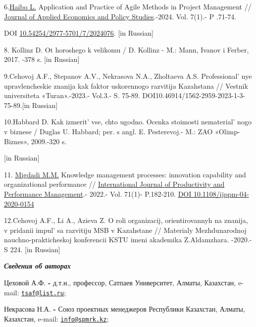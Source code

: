 6.\href{https://www.researchgate.net/scientific-contributions/Haibo-Li-2290691805?_tp=eyJjb250ZXh0Ijp7ImZpcnN0UGFnZSI6Il9kaXJlY3QiLCJwYWdlIjoicHVibGljYXRpb24iLCJwcmV2aW91c1BhZ2UiOiJfZGlyZWN0In19}{Haibo
L.} Application and Practice of Agile Methods in Project Management //
\href{https://www.researchgate.net/journal/Journal-of-Applied-Economics-and-Policy-Studies-2977-571X?_tp=eyJjb250ZXh0Ijp7ImZpcnN0UGFnZSI6Il9kaXJlY3QiLCJwYWdlIjoicHVibGljYXRpb24iLCJwcmV2aW91c1BhZ2UiOiJfZGlyZWN0In19}{Journal
of Applied Economics and Policy Studies}.-2024. Vol. 7(1).- P .71-74.

DOI
\href{http://dx.doi.org/10.54254/2977-5701/7/2024076}{10.54254/2977-5701/7/2024076}.
{[}in Russian{]}

8. Kollinz D. Ot horoshego k velikomu / D. Kollinz - M.: Mann, Ivanov i
Ferber, 2017. -378 s. {[}in Russian{]}

9.Cehovoj A.F., Stepanov A.V., Nekrasova N.A., Zholtaeva A.S.
Professional' nye upravlencheskie znanija kak faktor
uskorennogo razvitija Kazahstana // Vestnik universiteta «Turan».-2023.-
Vol.3.- S. 75-89. DOI10.46914/1562-2959-2023-1-3-75-89.{[}in Russian{]}

10.Habbard D. Kak izmerit'{} vse, chto ugodno. Ocenka
stoimosti nematerial' nogo v biznese / Duglas U. Habbard;
per. s angl. E. Pesterevoj.- M.: ZAO «Olimp-Biznes», 2009.-320 s.

{[}in Russian{]}

11.
\href{https://www.emerald.com/insight/search?q=Mahmoud\%20Mohammad\%20Migdadi}{Migdadi
M.M.} Knowledge management processes: innovation capability and
organizational performance //
\href{https://www.emerald.com/insight/publication/issn/1741-0401}{International
Journal of Productivity and Performance Management}.- 2022.- Vol. 71(1)-
P.182-210. \href{https://doi.org/10.1108/ijppm-04-2020-0154}{DOI
10.1108/ijppm-04-2020-0154}

12.Cehovoj A.F., Li A., Azieva Z. O roli organizacij, orientirovannyh na
znanija, v pridanii impul' sa razvitiju MSB v Kazahstane
// Materialy Mezhdunarodnoj nauchno-prakticheskoj konferencii KSTU imeni
akademika Z.Aldamzhara. -2020.- S 224. {[}in Russian{]}

\emph{{\bfseries Сведения об авторах}}

Цеховой А.Ф. {\bfseries -} д.т.н., профессор, Сатпаев Университет, Алматы,
Казахстан, e-mail: \href{mailto:tsaf@list.ru}{\nolinkurl{tsaf@list.ru}};

Некрасова Н.А. {\bfseries -} Союз проектных менеджеров Республики
Казахстан, Алматы, Казахстан, e-mail:
\href{mailto:info@spmrk.kz}{\nolinkurl{info@spmrk.kz}};

